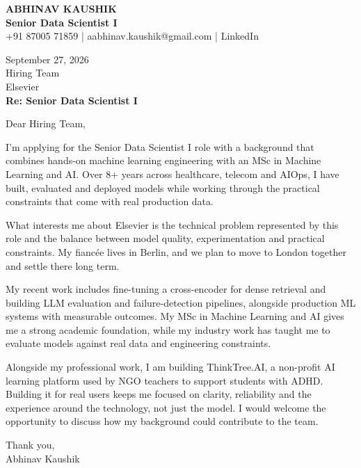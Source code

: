 \documentclass[10pt,a4paper]{article}
\begin{document}
\begin{center}
{\Large\bfseries ABHINAV KAUSHIK}\\[2pt]
{\bfseries Senior Data Scientist I}\\[2pt]
+91 87005 71859 \quad | \quad aabhinav.kaushik@gmail.com \quad | \quad LinkedIn
\end{center}
\vspace{8pt}
September 27, 2026\\[6pt]
Hiring Team\\
Elsevier\\[4pt]
\textbf{Re: Senior Data Scientist I}

Dear Hiring Team,

I’m applying for the Senior Data Scientist I role with a background that combines hands-on machine learning engineering with an MSc in Machine Learning and AI. Over 8+ years across healthcare, telecom and AIOps, I have built, evaluated and deployed models while working through the practical constraints that come with real production data.

What interests me about Elsevier is the technical problem represented by this role and the balance between model quality, experimentation and practical constraints. My fiancée lives in Berlin, and we plan to move to London together and settle there long term.

My recent work includes fine-tuning a cross-encoder for dense retrieval and building LLM evaluation and failure-detection pipelines, alongside production ML systems with measurable outcomes. My MSc in Machine Learning and AI gives me a strong academic foundation, while my industry work has taught me to evaluate models against real data and engineering constraints.

Alongside my professional work, I am building ThinkTree.AI, a non-profit AI learning platform used by NGO teachers to support students with ADHD. Building it for real users keeps me focused on clarity, reliability and the experience around the technology, not just the model. I would welcome the opportunity to discuss how my background could contribute to the team.

Thank you,\\
Abhinav Kaushik
\end{document}
